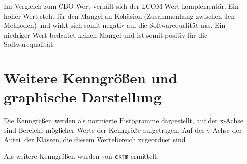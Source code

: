 \documentclass{scrreprt}
\newcommand{\lstx}[1]{\lstinline$#1$}
\begin{document}
Im Vergleich zum CBO-Wert verhält sich der LCOM-Wert komplementär. Ein hoher Wert steht für den Mangel an Kohäsion (Zusammenhang zwischen den Methoden) und wirkt sich somit negativ auf die Softwarequalität aus.
Ein niedriger Wert bedeutet keinen Mangel und ist somit positiv für die Softwarequalität.

\pagebreak

\section{Weitere Kenngrößen und graphische Darstellung}


Die Kenngrößen werden als normierte Histogramme dargestellt, auf der x-Achse sind Bereiche möglicher Werte der Kenngröße aufgetragen. Auf der y-Achse der Anteil der Klassen, die diesem Wertebereich zugeordnet sind.

Als weitere Kenngrößen wurden von \lstx{ckjm} ermittelt:
\end{document}
